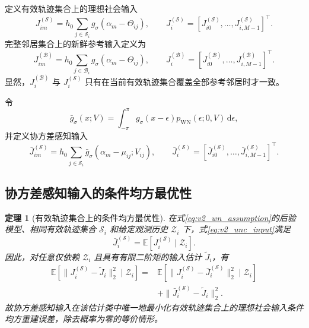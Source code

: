 \documentclass[UTF8,fontset=windows,11pt]{ctexart}
\newtheorem{theorem}{定理}[section]
\newcommand{\E}{\mathbb E}
\begin{document}
定义有效轨迹集合上的理想社会输入
\begin{equation}
 J_{im}^{(\mathcal S)}=h_0\sum_{j\in\mathcal S_i}g_\sigma(\alpha_m-\Theta_{ij}),
 \qquad
 J_i^{(\mathcal S)}=[J_{i0}^{(\mathcal S)},\ldots,J_{i,M-1}^{(\mathcal S)}]^{\top}.
 \label{eq:v2_tracked_ideal}
\end{equation}
完整邻居集合上的新鲜参考输入定义为
\begin{equation}
 J_{im}^{(\mathcal B)}=h_0\sum_{j\in\mathcal B_i}g_\sigma(\alpha_m-\Theta_{ij}),
 \qquad
 J_i^{(\mathcal B)}=[J_{i0}^{(\mathcal B)},\ldots,J_{i,M-1}^{(\mathcal B)}]^{\top}.
 \label{eq:v2_full_ideal}
\end{equation}
显然，$J_i^{(\mathcal B)}$ 与 $J_i^{(\mathcal S)}$ 只有在当前有效轨迹集合覆盖全部参考邻居时才一致。

令
\begin{equation}
 \bar g_\sigma(x;V)=\int_{-\pi}^{\pi}g_\sigma(x-\epsilon)
 p_{\operatorname{WN}}(\epsilon;0,V)\,\mathrm d\epsilon,
 \label{eq:v2_conv_kernel}
\end{equation}
并定义协方差感知输入
\begin{equation}
 \bar J_{im}^{(\mathcal S)}=h_0\sum_{j\in\mathcal S_i}
 \bar g_\sigma(\alpha_m-\mu_{ij};V_{ij}),
 \qquad
 \bar J_i^{(\mathcal S)}=[\bar J_{i0}^{(\mathcal S)},\ldots,\bar J_{i,M-1}^{(\mathcal S)}]^{\top}.
 \label{eq:v2_unc_input}
\end{equation}

\subsection{协方差感知输入的条件均方最优性}

\begin{theorem}[有效轨迹集合上的条件均方最优性]
\label{thm:v2_mmse}
在式\eqref{eq:v2_wn_assumption}的后验模型、相同有效轨迹集合 $\mathcal S_i$ 和给定观测历史 $\mathcal Z_i$ 下，式\eqref{eq:v2_unc_input}满足
\begin{equation}
 \bar J_i^{(\mathcal S)}=\E[J_i^{(\mathcal S)}\mid\mathcal Z_i].
 \label{eq:v2_conditional_mean}
\end{equation}
因此，对任意仅依赖 $\mathcal Z_i$ 且具有有限二阶矩的输入估计 $\widetilde J_i$，有
\begin{equation}
 \begin{aligned}
 \E[\|J_i^{(\mathcal S)}-\widetilde J_i\|_2^2\mid\mathcal Z_i]
 ={}&\E[\|J_i^{(\mathcal S)}-\bar J_i^{(\mathcal S)}\|_2^2\mid\mathcal Z_i]\\
 &+\|\bar J_i^{(\mathcal S)}-\widetilde J_i\|_2^2.
 \end{aligned}
 \label{eq:v2_orthogonal_projection}
\end{equation}
故协方差感知输入在该估计类中唯一地最小化有效轨迹集合上的理想社会输入条件均方重建误差，除去概率为零的等价情形。
\end{theorem}
\end{document}
